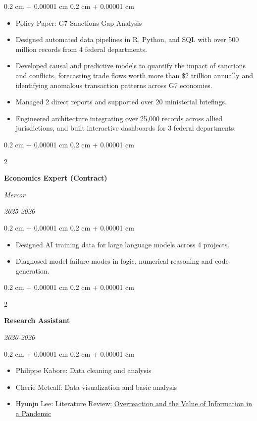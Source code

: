 \documentclass[10pt, letterpaper]{article}
\newenvironment{highlights}{
    \begin{itemize}[
        topsep=0.10 cm,
        parsep=0.10 cm,
        partopsep=0pt,
        itemsep=0pt,
        leftmargin=0.4 cm + 10pt
    ]
}{
    \end{itemize}
} %
\newenvironment{onecolentry}{
    \begin{adjustwidth}{
        0.2 cm + 0.00001 cm
    }{
        0.2 cm + 0.00001 cm
    }
}{
    \end{adjustwidth}
} %
\newenvironment{twocolentry}[2][]{
    \onecolentry
    \def\secondColumn{#2}
    \setcolumnwidth{\fill, 4.5 cm}
    \begin{paracol}{2}
}{
    \switchcolumn \raggedleft \secondColumn
    \end{paracol}
    \endonecolentry
} %
\let\hrefWithoutArrow\href
\renewcommand{\href}[2]{\hrefWithoutArrow{#1}{\ifthenelse{\equal{#2}{}}{ }{#2 }\raisebox{.15ex}{\footnotesize \faExternalLink*}}}
\begin{document}
        \vspace{0.10 cm}
        \begin{onecolentry}
            \begin{highlights}
                 \item Policy Paper: G7 Sanctions Gap Analysis
                
                \item Designed automated data pipelines in R, Python, and SQL with over 500 million records from 4 federal departments.
                \item Developed causal and predictive models to quantify the impact of sanctions and conflicts, forecasting trade flows worth more than \$2 trillion annually and identifying anomalous transaction patterns across G7 economies.
                \item Managed 2 direct reports and supported over 20 ministerial briefings.
                \item Engineered architecture integrating over 25,000 records across allied jurisdictions, and built interactive dashboards for 3 federal departments.
            \end{highlights}
        \end{onecolentry}
\vspace{0.2 cm}
        \begin{twocolentry}{\textit{2025-2026}}
            \textbf{Economics Expert (Contract)}

            
            \textit{Mercor}
        \end{twocolentry}
        \begin{onecolentry}
    \begin{highlights}
              \item Designed AI training data for large language models across 4 projects.
            \item Diagnosed model failure modes in logic, numerical reasoning and code generation.
    \end{highlights}
        \end{onecolentry}
 
        \vspace{0.2 cm}
        \begin{twocolentry}{\textit{2020-2026}}
            \textbf{Research Assistant}
        \end{twocolentry}
        \begin{onecolentry}
            \begin{highlights}
                \item Philippe Kabore: Data cleaning and analysis
                \item Cherie Metcalf: Data visualization and basic analysis
                \item Hyunju Lee: Literature Review; \hrefWithoutArrow{https://papers.ssrn.com/sol3/papers.cfm?abstract_id=3910487}{Overreaction and the Value of Information in a Pandemic}
            \end{highlights}
        \end{onecolentry}
        
\end{document}
